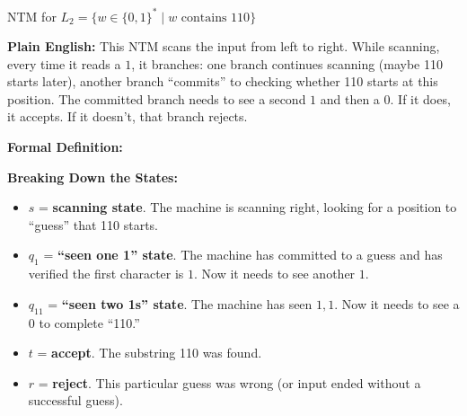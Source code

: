 \begin{definitionbox}{{NTM for $L_2 = \{w \in \{0,1\}^* \mid w \text{ contains 110}\}$}}

\textbf{Plain English:}
This NTM scans the input from left to right. While scanning, every time it
reads a $1$, it branches: one branch continues scanning (maybe 110 starts
later), another branch ``commits'' to checking whether 110 starts at this
position. The committed branch needs to see a second $1$ and then a $0$. If it
does, it accepts. If it doesn't, that branch rejects.

\textbf{Formal Definition:}

\textbf{Breaking Down the States:}
\begin{itemize}[nosep]
\item $s$ = \textbf{scanning state}. The machine is scanning right, looking for
  a position to ``guess'' that 110 starts.
\item $q_1$ = \textbf{``seen one 1'' state}. The machine has committed to a
  guess and has verified the first character is $1$. Now it needs to see another
  $1$.
\item $q_{11}$ = \textbf{``seen two 1s'' state}. The machine has seen $1, 1$.
  Now it needs to see a $0$ to complete ``110.''
\item $t$ = \textbf{accept}. The substring 110 was found.
\item $r$ = \textbf{reject}. This particular guess was wrong (or input ended
  without a successful guess).
\end{itemize}
\end{definitionbox}

